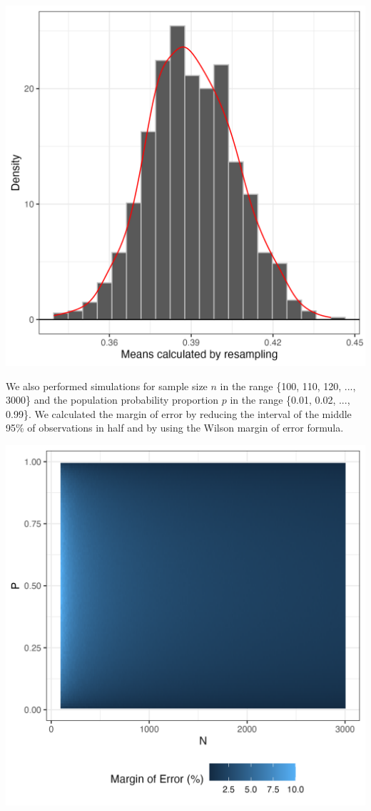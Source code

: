 \documentclass{article}\usepackage[]{graphicx}\usepackage[]{xcolor}
\newenvironment{Figure}
  {\par\medskip\noindent\minipage{\linewidth}}
  {\endminipage\par\medskip}
\begin{document}
\begin{multicols}{2}
\begin{Figure}
 \centering
 \includegraphics[width = 0.5\linewidth]{resample.png}
 \label{fig:res}
\end{Figure}

We also performed simulations for sample size $n$ in the range \{100, 110, 120, ..., 3000\} and the population probability proportion $p$ in the range \{0.01, 0.02, ..., 0.99\}. We calculated the margin of error by reducing the interval of the middle 95\% of observations in half and by using the Wilson margin of error formula.

\begin{Figure}
 \centering
 \includegraphics[width =0.7\linewidth]{error.png}
 \label{fig:err}
\end{Figure}


\end{multicols}
\end{document}
